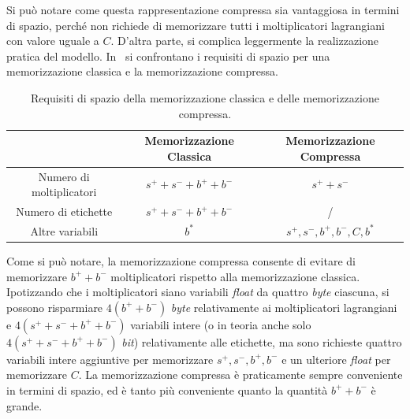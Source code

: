 Si può notare come questa rappresentazione compressa sia vantaggiosa in termini di spazio, perché non richiede di memorizzare tutti i moltiplicatori lagrangiani con valore uguale a $C$.
D'altra parte, si complica leggermente la realizzazione pratica del modello.
In~ si confrontano i requisiti di spazio per una memorizzazione classica e la memorizzazione compressa.
\begin{table}
    \centering
    \begin{tabular}{c|c|c}
    \multicolumn{1}{c}{}    &  Memorizzazione Classica    & Memorizzazione Compressa \\     
    \toprule
    Numero di moltiplicatori    & $s^+ + s^- + b^+ + b^-$ & $s^+ +s^-$ \\
    \hline
    Numero di etichette         & $s^+ + s^- + b^+ + b^-$ &  / \\
    \hline
    Altre variabili             &         $b^*$          &  $s^+, s^-, b^+, b^-, C, b^*$ \\
    \bottomrule
    \end{tabular}
    \caption{Requisiti di spazio della memorizzazione classica e delle memorizzazione compressa.}
    \label{tab:compressione_spazio_risparmiato}
\end{table}
Come si può notare, la memorizzazione compressa consente di evitare di memorizzare $b^++b^-$ moltiplicatori rispetto alla memorizzazione classica.
Ipotizzando che i moltiplicatori siano variabili \emph{float} da quattro \emph{byte} ciascuna, si possono risparmiare $4(b^++b^-)$ \emph{byte} relativamente ai moltiplicatori lagrangiani e $4(s^+ + s^- + b^+ + b^-)$ variabili intere (o in teoria anche solo $4(s^+ + s^- + b^+ + b^-)$ \emph{bit}) relativamente alle etichette, ma sono richieste quattro variabili intere aggiuntive per memorizzare $s^+, s^-, b^+, b^-$ e un ulteriore \emph{float} per memorizzare $C$.
La memorizzazione compressa è praticamente sempre conveniente in termini di spazio, ed è tanto più conveniente quanto la quantità $b^++b^-$ è grande.

